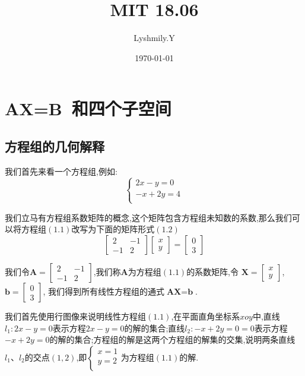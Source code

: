 \documentclass[oneside]{book}
\title{MIT 18.06}
\author{Lyshmily.Y}
\date{\today}
\begin{document}
	\maketitle
	\tableofcontents
	\newpage
	\part{AX=B\ 和四个子空间}
	\chapter{方程组的几何解释}
	我们首先来看一个方程组,例如:
	\begin{equation}\left\{
	\begin{array}{c}
		2x-y=0\\
		-x+2y=4\\
	\end{array}
	\right.
	\end{equation}
	
	我们立马有方程组系数矩阵的概念,这个矩阵包含方程组未知数的系数,那么我们可以将方程组$(1.1)$改写为下面的矩阵形式$(1.2)$
	\begin{equation}
	\left[
	\begin{array}{cc}
		2 & -1\\
		-1 & 2 
	\end{array}
	\right]
	\left[
	\begin{array}{c}
		x\\
		y 
	\end{array}
	\right]
	=
	\left[
	\begin{array}{cc}
		0\\
		3 
	\end{array}
	\right]
	\end{equation}
	
	我们令$
	\textbf{A}=
	\left[
	\begin{array}{cc}
		2 & -1\\
		-1 & 2 
	\end{array}
	\right]
	$,我们称$\textbf{A}$为方程组$(1.1)$的系数矩阵,令
	$\textbf{X}=\left[
	\begin{array}{c}
		x\\
		y 
	\end{array}
	\right]$, $\textbf{b}=\left[
	\begin{array}{cc}
		0\\
		3 
	\end{array}
	\right]$, 我们得到所有线性方程组的通式$\textbf{AX}=\textbf{b}$.
	
	我们首先使用行图像来说明线性方程组$(1.1)$,在平面直角坐标系$xoy$中,直线$l_{1}:2x-y=0$表示方程$2x-y=0$的解的集合;直线$l_{2}:-x+2y=0=0$表示方程$-x+2y=0$的解的集合;方程组的解是这两个方程组的解集的交集,说明两条直线$l_{1}、l_{2}$的交点$ (1,2) $,即$ \left\{
	\begin{array}{c}
		x=1\\
		y=2\\
	\end{array}
	\right.$为方程组$(1.1)$的解.
	
\end{document}
